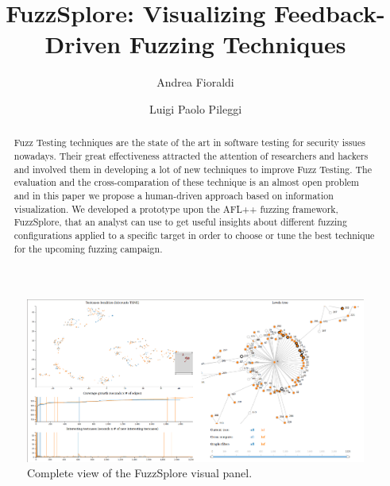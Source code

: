 \documentclass[conference,compsoc]{IEEEtran}
\begin{document}
\title{FuzzSplore: Visualizing Feedback-Driven Fuzzing Techniques}

\author[1]{Andrea Fioraldi}
\author[1]{Luigi Paolo Pileggi}

\maketitle

\begin{figure}[t]
\centering
\includegraphics[width=1.0\textwidth]{img/full}
\caption{Complete view of the {\sc FuzzSplore} visual panel.}
\label{fig:full}
\end{figure}

\begin{abstract}
Fuzz Testing techniques are the state of the art in software testing for security issues nowadays.
Their great effectiveness attracted the attention of researchers and hackers and involved them in developing a lot of new techniques to improve Fuzz Testing.
The evaluation and the cross-comparation of these technique is an almost open problem and in this paper we propose a human-driven approach based on information visualization.
We developed a prototype upon the {\sc AFL++} fuzzing framework, {\sc FuzzSplore}, that an analyst can use to get useful insights about different fuzzing configurations applied to a specific target in order to choose or tune the best technique for the upcoming fuzzing campaign.
\end{abstract}
\end{document}
